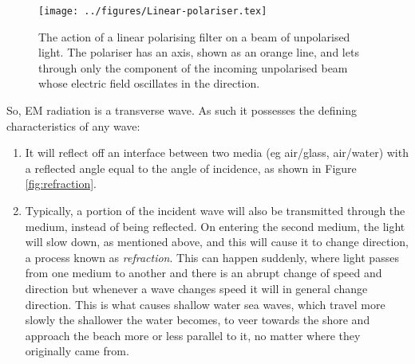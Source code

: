\documentclass[class=scrartcl, crop=false,parskip=half]{standalone}
\begin{document}
\begin{figure}
\centering
\texttt{[image: ../figures/Linear-polariser.tex]}
\caption{The action of a linear polarising filter on a beam of unpolarised light. The polariser has an axis, shown as an orange line, and lets through only the component of the incoming unpolarised beam whose electric field oscillates in the direction.}
\label{fig:linear-polariser}
\end{figure}

So, EM radiation is a transverse wave. As such it possesses the defining characteristics of any wave:
\begin{enumerate}
\item It will reflect off an interface between two media (eg air/glass, air/water) with a reflected angle equal to the angle of incidence, as shown in Figure \ref{fig:refraction}. 
\item Typically, a portion of the incident wave will also be transmitted through the medium, instead of being reflected. On entering the second medium, the light will slow down, as mentioned above, and this will cause it to change direction, a process known as \emph{refraction}. This can happen suddenly, where light passes from one medium to another and there is an abrupt change of speed and direction but whenever a wave changes speed it will in general change direction. This is what causes shallow water sea waves, which travel more slowly the shallower the water becomes, to veer towards the shore and approach the beach more or less parallel to it, no matter where they originally came from.


\end{enumerate}
\end{document}
